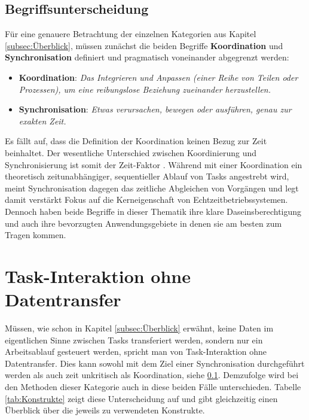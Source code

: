 \documentclass{llncs}
\begin{document}
\subsection{Begriffsunterscheidung}
\label{subsec:Begriffsgrundlage}
Für eine genauere Betrachtung der einzelnen Kategorien aus Kapitel \ref{subsec:Überblick}, müssen zunächst die beiden Begriffe \textbf{Koordination} und \textbf{Synchronisation} definiert und pragmatisch voneinander abgegrenzt werden:
\begin{itemize}
	\setlength\itemsep{0.5em} %
	\item \textbf{Koordination}: \textit{\glqq Das Integrieren und Anpassen (einer Reihe von Teilen oder Prozessen), um eine reibungslose Beziehung zueinander herzustellen.\grqq{}} \autocite[80]{Cooling2017}
	\item \textbf{Synchronisation}: \textit{\glqq Etwas verursachen, bewegen oder ausführen, genau zur exakten Zeit.\grqq{}} \autocite[80]{Cooling2017}
\end{itemize}
Es fällt auf, dass die Definition der Koordination keinen Bezug zur Zeit beinhaltet. Der wesentliche Unterschied zwischen Koordinierung und Synchronisierung ist somit der Zeit-Faktor \autocite[vgl.][80]{Cooling2017}. Während mit einer Koordination ein theoretisch zeitunabhängiger, sequentieller Ablauf von Tasks angestrebt wird, meint Synchronisation dagegen das zeitliche Abgleichen von Vorgängen und legt damit verstärkt Fokus auf die Kerneigenschaft von Echtzeitbetriebssystemen. Dennoch haben beide Begriffe in dieser Thematik ihre klare Daseinsberechtigung und auch ihre bevorzugten Anwendungsgebiete in denen sie am besten zum Tragen kommen.

\section{Task-Interaktion ohne Datentransfer}
\label{sub:Task_Interaktion_ohne_Datentransfer}
Müssen, wie schon in Kapitel \ref{subsec:Überblick} erwähnt, keine Daten im eigentlichen Sinne zwischen Tasks transferiert werden, sondern nur ein Arbeitsablauf gesteuert werden, spricht man von Task-Interaktion ohne Datentransfer. Dies kann sowohl mit dem Ziel einer Synchronisation durchgeführt werden als auch zeit unkritisch als Koordination, siehe \ref{subsec:Begriffsgrundlage}. Demzufolge wird bei den Methoden dieser Kategorie auch in diese beiden Fälle unterschieden. Tabelle \ref{tab:Konstrukte} zeigt diese Unterscheidung auf und gibt gleichzeitig einen Überblick über die jeweils zu verwendeten Konstrukte.
\end{document}
